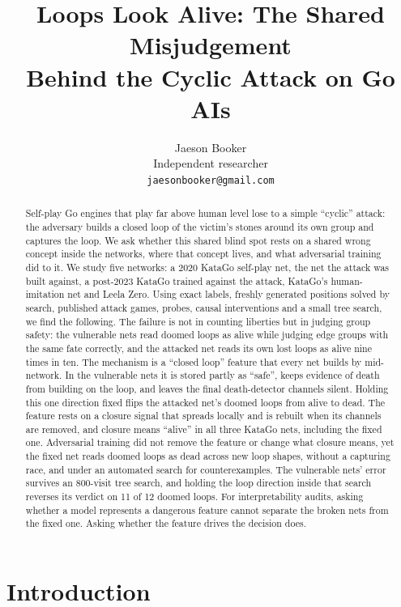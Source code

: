 \documentclass[11pt]{article}
\title{Loops Look Alive: The Shared Misjudgement\\Behind the Cyclic Attack on Go AIs}
\author{Jaeson Booker\\Independent researcher\\\texttt{jaesonbooker@gmail.com}}
\date{}
\begin{document}
\maketitle

\begin{abstract}
Self-play Go engines that play far above human level lose to a simple ``cyclic'' attack: the adversary builds a closed loop of the victim's stones around its own group and captures the loop. We ask whether this shared blind spot rests on a shared wrong concept inside the networks, where that concept lives, and what adversarial training did to it. We study five networks: a 2020 KataGo self-play net, the net the attack was built against, a post-2023 KataGo trained against the attack, KataGo's human-imitation net and Leela Zero. Using exact labels, freshly generated positions solved by search, published attack games, probes, causal interventions and a small tree search, we find the following. The failure is not in counting liberties but in judging group safety: the vulnerable nets read doomed loops as alive while judging edge groups with the same fate correctly, and the attacked net reads its own lost loops as alive nine times in ten. The mechanism is a ``closed loop'' feature that every net builds by mid-network. In the vulnerable nets it is stored partly as ``safe'', keeps evidence of death from building on the loop, and leaves the final death-detector channels silent. Holding this one direction fixed flips the attacked net's doomed loops from alive to dead. The feature rests on a closure signal that spreads locally and is rebuilt when its channels are removed, and closure means ``alive'' in all three KataGo nets, including the fixed one. Adversarial training did not remove the feature or change what closure means, yet the fixed net reads doomed loops as dead across new loop shapes, without a capturing race, and under an automated search for counterexamples. The vulnerable nets' error survives an 800-visit tree search, and holding the loop direction inside that search reverses its verdict on 11 of 12 doomed loops. For interpretability audits, asking whether a model represents a dangerous feature cannot separate the broken nets from the fixed one. Asking whether the feature drives the decision does.
\end{abstract}

\section{Introduction}
\end{document}
